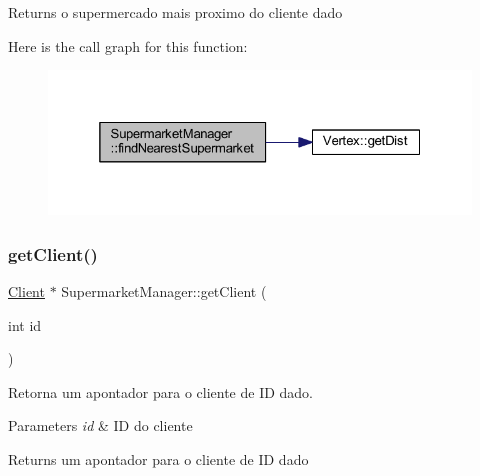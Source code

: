 \begin{DoxyReturn}{Returns}
o supermercado mais proximo do cliente dado 
\end{DoxyReturn}
Here is the call graph for this function\+:
\nopagebreak
\begin{figure}[H]
\begin{center}
\leavevmode
\includegraphics[width=325pt]{class_supermarket_manager_a3869489967f0a60d1b9c36a85b05998b_cgraph}
\end{center}
\end{figure}
\mbox{\label{class_supermarket_manager_a15c50e904600847775367ff4f626f62d}} 
\subsubsection{\texorpdfstring{get\+Client()}{getClient()}}
{\footnotesize\ttfamily \hyperlink{class_client}{Client} $\ast$ Supermarket\+Manager\+::get\+Client (\begin{DoxyParamCaption}\item[{int}]{id }\end{DoxyParamCaption})}

Retorna um apontador para o cliente de ID dado.


\begin{DoxyParams}{Parameters}
{\em id} & ID do cliente \\
\hline
\end{DoxyParams}
\begin{DoxyReturn}{Returns}
um apontador para o cliente de ID dado 
\end{DoxyReturn}
\mbox{\label{class_supermarket_manager_a45ed55914bea37bcf0d5757d1ce027c4}} 
